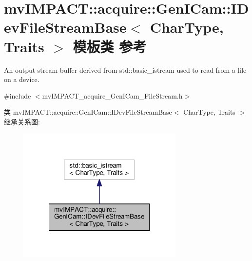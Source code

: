 \hypertarget{classmv_i_m_p_a_c_t_1_1acquire_1_1_gen_i_cam_1_1_i_dev_file_stream_base}{\section{mv\+I\+M\+P\+A\+C\+T\+:\+:acquire\+:\+:Gen\+I\+Cam\+:\+:I\+Dev\+File\+Stream\+Base$<$ Char\+Type, Traits $>$ 模板类 参考}
\label{classmv_i_m_p_a_c_t_1_1acquire_1_1_gen_i_cam_1_1_i_dev_file_stream_base}
}


An output stream buffer derived from std\+::basic\+\_\+istream used to read from a file on a device.  




{\ttfamily \#include $<$mv\+I\+M\+P\+A\+C\+T\+\_\+acquire\+\_\+\+Gen\+I\+Cam\+\_\+\+File\+Stream.\+h$>$}



类 mv\+I\+M\+P\+A\+C\+T\+:\+:acquire\+:\+:Gen\+I\+Cam\+:\+:I\+Dev\+File\+Stream\+Base$<$ Char\+Type, Traits $>$ 继承关系图\+:
\nopagebreak
\begin{figure}[H]
\begin{center}
\leavevmode
\includegraphics[width=234pt]{classmv_i_m_p_a_c_t_1_1acquire_1_1_gen_i_cam_1_1_i_dev_file_stream_base__inherit__graph}
\end{center}
\end{figure}


